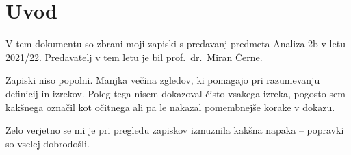 \section*{Uvod}

V tem dokumentu so zbrani moji zapiski s predavanj predmeta Analiza
2b v letu 2021/22. Predavatelj v tem letu je bil prof.~dr.~Miran
Černe.

Zapiski niso popolni. Manjka večina zgledov, ki pomagajo pri
razumevanju definicij in izrekov. Poleg tega nisem dokazoval čisto
vsakega izreka, pogosto sem kakšnega označil kot očitnega ali pa le
nakazal pomembnejše korake v dokazu.

Zelo verjetno se mi je pri pregledu zapiskov izmuznila kakšna napaka
-- popravki so vselej dobrodošli.
